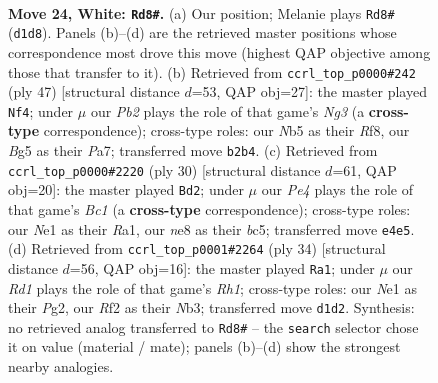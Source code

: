\documentclass[11pt]{article}
\begin{document}
\clearpage

\begin{figure}[p]\centering
\begin{subfigure}{0.46\textwidth}\centering
\resizebox{\linewidth}{!}{%
\newchessgame
\chessboard[
  setfen={rnk1nbr1/1p5p/4p1p1/pNP3B1/P3P3/8/1P3RPP/3RN1K1 w - - 2 24},
  showmover=false,
  pgfstyle=straightmove, color=movearrow, markmove={d1-d8}
]}
\caption{}
\end{subfigure}\hfill
\begin{subfigure}{0.46\textwidth}\centering
\resizebox{\linewidth}{!}{%
\newchessgame
\chessboard[
  setfen={5rk1/p5pp/2r3n1/4pp2/1RNp4/3P3P/P1P2PP1/3R2K1 b - - 0 24},
  showmover=false,
  pgfstyle=straightmove, color=movearrow, markmove={g6-f4}
]}
\caption{}
\end{subfigure}
\\[4pt]
\begin{subfigure}{0.46\textwidth}\centering
\resizebox{\linewidth}{!}{%
\newchessgame
\chessboard[
  setfen={2r1k2r/pp3ppp/4p3/2bn4/P1N5/2PR4/1P2KPPP/R1B5 w k - 3 16},
  showmover=false,
  pgfstyle=straightmove, color=movearrow, markmove={c1-d2}
]}
\caption{}
\end{subfigure}\hfill
\begin{subfigure}{0.46\textwidth}\centering
\resizebox{\linewidth}{!}{%
\newchessgame
\chessboard[
  setfen={rnr1b1k1/1p3ppp/3Rp3/p7/4PP2/1NPB4/1KP3PP/7R w - - 4 18},
  showmover=false,
  pgfstyle=straightmove, color=movearrow, markmove={h1-a1}
]}
\caption{}
\end{subfigure}
\caption{\textbf{Move 24, White: \texttt{Rd8\#}.} (a) Our position; Melanie plays \texttt{Rd8\#} (\texttt{d1d8}). Panels (b)--(d) are the retrieved master positions whose correspondence most drove this move (highest QAP objective among those that transfer to it). (b) Retrieved from \texttt{ccrl\_top\_p0000\#242} (ply 47) [structural distance $d$=53, QAP obj=27]: the master played \texttt{Nf4}; under $\mu$ our \emph{Pb2} plays the role of that game's \emph{Ng3} (a \textbf{cross-type} correspondence); cross-type roles: our \emph{N}b5 as their \emph{R}f8, our \emph{B}g5 as their \emph{P}a7; transferred move \texttt{b2b4}. (c) Retrieved from \texttt{ccrl\_top\_p0000\#2220} (ply 30) [structural distance $d$=61, QAP obj=20]: the master played \texttt{Bd2}; under $\mu$ our \emph{Pe4} plays the role of that game's \emph{Bc1} (a \textbf{cross-type} correspondence); cross-type roles: our \emph{N}e1 as their \emph{R}a1, our \emph{n}e8 as their \emph{b}c5; transferred move \texttt{e4e5}. (d) Retrieved from \texttt{ccrl\_top\_p0001\#2264} (ply 34) [structural distance $d$=56, QAP obj=16]: the master played \texttt{Ra1}; under $\mu$ our \emph{Rd1} plays the role of that game's \emph{Rh1}; cross-type roles: our \emph{N}e1 as their \emph{P}g2, our \emph{R}f2 as their \emph{N}b3; transferred move \texttt{d1d2}. Synthesis: no retrieved analog transferred to \texttt{Rd8\#} -- the \texttt{search} selector chose it on value (material / mate); panels (b)--(d) show the strongest nearby analogies.}
\label{fig:thought-m46}
\end{figure}
\end{document}
